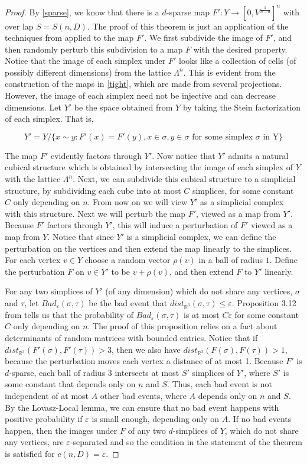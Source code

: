 \documentclass[12pt]{article}
\newcommand{\RR}{\mathbb{R}}
\newcommand{\eps}{\mathbb{\varepsilon}}
\begin{document}
	
	\begin{proof} By \cref{sparse}, we know that there is a $d$-sparse map $F': Y \to [0, V^{\frac{1}{n-d}}]^{n}$ with over lap $S = S(n,D)$. The proof of this theorem is just an application of the techniques from \cite{GG} applied to the map $F'$. We first subdivide the image of $F'$, and then randomly perturb this subdivision to a map $F$ with the desired property. Notice that the image of each simplex under $F'$ looks like a collection of cells (of possibly different dimensions) from the lattice $\Lambda^n$. This is evident from the construction of the maps in \cref{tight}, which are made from several projections. However, the image of each simplex need not be injective and can decrease dimensions. Let $Y'$ be the space obtained from $Y$ by taking the Stein factorization of each simplex. That is,
		
	$$Y' = Y / \{x \sim y : F'(x) = F'(y), x \in \sigma, y \in \sigma \text{ for some simplex $\sigma$ in Y}\} $$
	
	The map $F'$ evidently factors through $Y'$. Now notice that $Y'$ admits a natural cubical structure which is obtained by intersecting the image of each simplex of $Y$ with the lattice $\Lambda^n$. Next, we can subdivide this cubical structure to a simplicial structure, by subdividing each cube into at most $C$ simplices, for some constant $C$ only depending on $n$. From now on we will view $Y'$ as a simplicial complex with this structure. Next we will perturb the map $F'$, viewed as a map from $Y'$. Because $F'$ factors through $Y'$, this will induce a perturbation of $F'$ viewed as a map from $Y$. Notice that since $Y'$ is a simplicial complex, we can define the perturbation on the vertices and then extend the map linearly to the simplices. For each vertex $v \in Y$ choose a random vector $\rho(v)$ in a ball of radius $1$. Define the perturbation $F$ on $v \in Y'$ to be $v + \rho(v)$, and then extend $F$ to $Y'$ linearly.
	
	For any two simplices of $Y'$ (of any dimension) which do not share any vertices, $\sigma$ and $\tau$, let $Bad_{\eps}(\sigma, \tau)$ be the bad event that $dist_{\RR^3}(\sigma, \tau) \le \eps$. Proposition 3.12 from \cite{GG} tells us that the probability of $Bad_{\eps}(\sigma, \tau)$ is at most $C\eps$ for some constant $C$ only depending on $n$. The proof of this proposition relies on a fact about determinants of random matrices with bounded entries. Notice that if $dist_{\RR^3}(F'(\sigma), F'(\tau)) > 3$, then we also have $dist_{\RR^3}(F(\sigma), F(\tau)) > 1$, because the perturbation moves each vertex a distance of at most 1. Because $F'$ is $d$-sparse, each ball of radius 3 intersects at most $S'$ simplices of $Y'$, where $S'$ is some constant that depends only on $n$ and $S$. Thus, each bad event is not independent of at most $A$ other bad events, where $A$ depends only on $n$ and $S$. By the Lovasz-Local lemma, we can ensure that no bad event happens with positive probability if $\eps$ is small enough, depending only on $A$. If no bad events happen, then the images under $F$ of any two $d$-simplices of $Y$, which do not share any vertices, are $\eps$-separated and so the condition in the statement of the theorem is satisfied for $c(n,D) = \eps$.


\end{proof}
\end{document}
